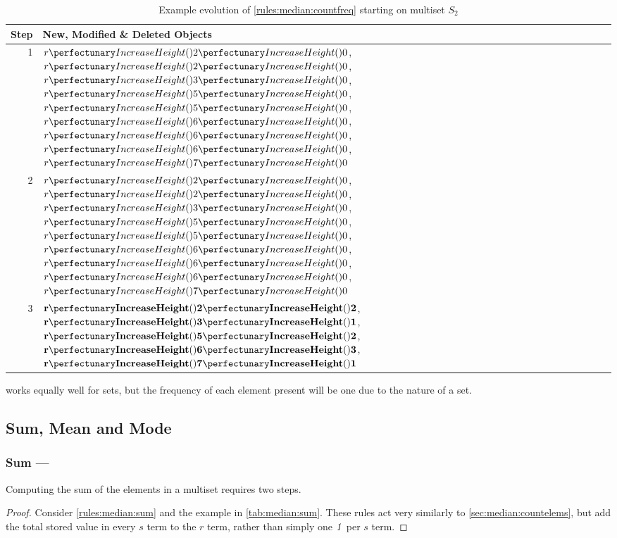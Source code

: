 \begin{table}[htbp]
\centering
   \begin{tabular}{|r|l|}
    \hline
    \textbf{Step} & \textbf{New, Modified \& Deleted Objects} \\ \hline
    1 & \(\cpfuncn{r}{2}{0}\), \(\cpfuncn{r}{2}{0}\), \(\cpfuncn{r}{3}{0}\), \(\cpfuncn{r}{5}{0}\), \(\cpfuncn{r}{5}{0}\), \(\cpfuncn{r}{6}{0}\), \(\cpfuncn{r}{6}{0}\), \(\cpfuncn{r}{6}{0}\), \(\cpfuncn{r}{7}{0}\)\\ \hline
    
    2 & \(\cpfuncn{r}{2}{0}\), \sout{\(\cpfuncn{r}{2}{0}\)}, \(\cpfuncn{r}{3}{0}\), \(\cpfuncn{r}{5}{0}\), \sout{\(\cpfuncn{r}{5}{0}\)}, \(\cpfuncn{r}{6}{0}\), \sout{\(\cpfuncn{r}{6}{0}\)}, \sout{\(\cpfuncn{r}{6}{0}\)}, \(\cpfuncn{r}{7}{0}\)\\ \hline
    
    3 & \(\mathbf{\cpfuncn{r}{2}{2}}\), \(\mathbf{\cpfuncn{r}{3}{1}}\), \(\mathbf{\cpfuncn{r}{5}{2}}\), \(\mathbf{\cpfuncn{r}{6}{3}}\), \(\mathbf{\cpfuncn{r}{7}{1}}\)\\ \hline
\end{tabular}
\caption[Example evolution of \cref{rules:median:countfreq}]{\label{tab:median:countfreq}Example evolution of \cref{rules:median:countfreq} starting on multiset \(S_2\)}
\end{table}

 works equally well for sets, but the frequency of each element present will be one due to the nature of a set.

\subsection{Sum, Mean and Mode}\label{sec:median:sumeanmode}

\subsubsection{Sum --- }\label{sec:median:sum}

\begin{proposition}\label{prop:median:sum}
Computing the sum of the elements in a multiset requires two steps.
\end{proposition}

\begin{proof}
Consider \cref{rules:median:sum} and the example in \cref{tab:median:sum}.  These rules act very similarly to \cref{sec:median:countelems}, but add the total stored value in every \(s\) term to the \(r\) term, rather than simply one \(\mathit{1}\) per \(s\) term.
\end{proof}

